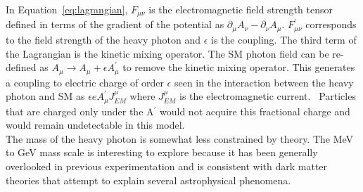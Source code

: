 In Equation~\eqref{eq:lagrangian}, $F_{\mu\nu}$ is the electromagnetic field strength tensor defined in terms of the gradient of the potential as $\partial_{\mu}A_{\nu}-\partial_{\nu}A_{\mu}$. $F^{\prime}_{\mu\nu}$ corresponds to the field strength of the heavy photon and $\epsilon$ is the coupling. The third term of the Lagrangian is the kinetic mixing operator. The SM photon field can be re-defined as $A_{\mu}\rightarrow A_{\mu}+\epsilon A^{\prime}_{\mu}$ to remove the kinetic mixing operator. This generates a coupling to electric charge of order $\epsilon$ seen in the interaction between the heavy photon and SM as $\epsilon e A^{\prime}_{\mu}J^{\mu}_{EM}$ where $J^{\mu}_{EM}$ is the electromagnetic current.~\cite{toro} Particles that are charged only under the A$^{\prime}$ would not acquire this fractional charge and would remain undetectable in this model. \\
\indent The mass of the heavy photon is somewhat less constrained by theory. The MeV to GeV mass scale is interesting to explore because it has been generally overlooked in previous experimentation and is consistent with dark matter theories that attempt to explain several astrophysical phenomena. 

